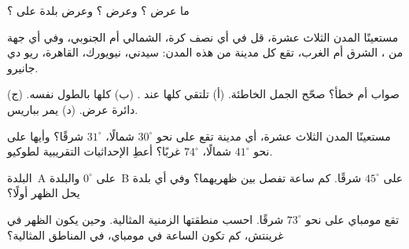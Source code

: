 \begin{exercise}[$\star$]\label{exo:g6:latitude-longitude:2}
ما عرض ؟ وعرض ؟ وعرض بلدة على
؟
\end{exercise}

\begin{exercise}[$\star$]\label{exo:g6:latitude-longitude:3}
مستعينًا  المدن الثلاث عشرة، قل في أي نصف كرة، الشمالي أم
الجنوبي، وفي أي جهة من ، الشرق أم الغرب، تقع كل
مدينة من هذه المدن: سيدني، نيويورك، القاهرة، ريو دي جانيرو.
\end{exercise}

\begin{exercise}[$\star$]\label{exo:g6:latitude-longitude:4}
صواب أم خطأ؟ صحّح الجمل الخاطئة.
(أ) تلتقي  كلها عند .
(ب)  كلها بالطول نفسه.
(ج)  دائرة عرض.
(د) يمر  بباريس.
\end{exercise}

\begin{exercise}[$\star\star$]\label{exo:g6:latitude-longitude:5}
مستعينًا  المدن الثلاث عشرة، أي مدينة تقع على نحو
$30^\circ$ شمالًا، $31^\circ$ شرقًا؟ وأيها على نحو $41^\circ$ شمالًا،
$74^\circ$ غربًا؟ أعطِ الإحداثيات التقريبية لطوكيو.
\end{exercise}

\begin{exercise}[$\star\star$]\label{exo:g6:latitude-longitude:6}
البلدة~A على  $0^\circ$ والبلدة~B على  $45^\circ$ شرقًا.
كم ساعة تفصل بين ظهريهما؟ وفي أي بلدة يحل الظهر أولًا؟
\end{exercise}

\begin{exercise}[$\star\star$]\label{exo:g6:latitude-longitude:7}
تقع مومباي على نحو $73^\circ$ شرقًا. احسب منطقتها الزمنية المثالية. وحين يكون
الظهر في غرينتش، كم تكون الساعة في مومباي، في المناطق المثالية؟
\end{exercise}

